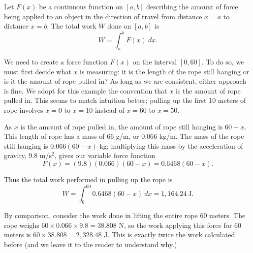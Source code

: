 {Let $F(x)$ be a continuous function on $[a,b]$ describing the amount of force being applied to an object in the direction of travel from distance $x=a$ to distance $x=b$. The total work $W$ done on $[a,b]$ is
\[
W = \int_a^b F(x)\ dx.
\]
}
\pagebreak

{We need to create a force function $F(x)$ on the interval $[0,60]$. To do so, we must first decide what $x$ is measuring: it is the length of the rope still hanging or is it the amount of rope pulled in? As long as we are consistent, either approach is fine. We adopt for this example the convention that $x$ is the amount of rope pulled in. This seems to match intuition better; pulling up the first 10 meters of rope involves $x=0$ to $x=10$ instead of $x=60$ to $x=50$. 

As $x$ is the amount of rope pulled in, the amount of rope still hanging is $60-x$. This length of rope has a mass of 66 g/m, or $0.066$ kg/m. The mass of the rope still hanging is $0.066(60-x)$ kg; multiplying this mass by the acceleration of gravity, 9.8 m/s$^2$, gives our variable force function 
\[
F(x) = (9.8)(0.066)(60-x) = 0.6468(60-x).
\]

Thus the total work performed in pulling up the rope is 
\[
W = \int_0^{60} 0.6468(60-x)\ dx = 1,164.24\ \text{J}.
\]

By comparison, consider the work done in lifting the entire rope 60 meters. The rope weighs $60\times 0.066 \times 9.8 = 38.808$ N, so the work applying this force for 60 meters is $60\times 38.808 = 2,328.48$ J. This is exactly twice the work calculated before (and we leave it to the reader to understand why.)
}\\

